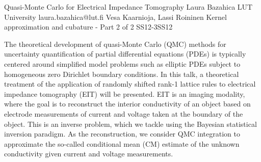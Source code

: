 \begin{talk}
  {Quasi-Monte Carlo for Electrical Impedance Tomography}%
  {Laura Bazahica}%
  {LUT University}%
  {laura.bazahica@lut.fi}%
  {Vesa Kaarnioja, Lassi Roininen}%
{Kernel approximation and cubature - Part 2 of 2}
{}{SS12-3}{SS12}

			
The theoretical development of quasi-Monte Carlo (QMC) methods for uncertainty quantification of partial differential equations (PDEs) is typically centered around simplified model problems such as elliptic PDEs subject to homogeneous zero Dirichlet boundary conditions. In this talk, a theoretical treatment of the application of randomly shifted rank-1 lattice rules to electrical impedance tomography (EIT) will be presented. EIT is an imaging modality, where the goal is to reconstruct the interior conductivity of an object based on electrode measurements of current and voltage taken at the boundary of the object. This is an inverse problem, which we tackle using the Bayesian statistical inversion paradigm. As the reconstruction, we consider QMC integration to approximate the so-called conditional mean (CM) estimate of the unknown conductivity given current and voltage measurements.

\medskip

\end{talk}

